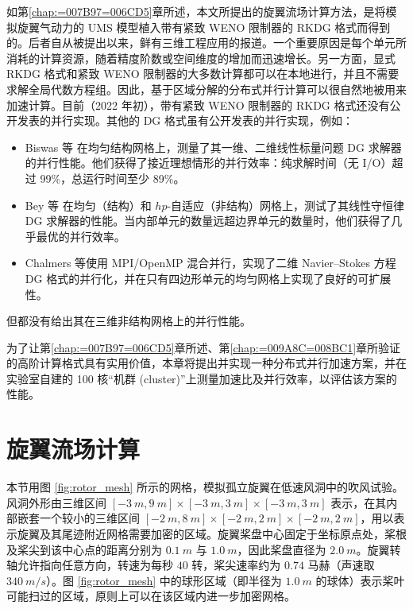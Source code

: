 如第\ref{chap:=007B97=006CD5}章所述，本文所提出的旋翼流场计算方法，是将模拟旋翼气动力的 UMS 模型植入带有紧致
WENO 限制器的 RKDG 格式而得到的。后者自从被提出以来，鲜有三维工程应用的报道。一个重要原因是每个单元所消耗的计算资源，随着精度阶数或空间维度的增加而迅速增长。另一方面，显式
RKDG 格式和紧致 WENO 限制器的大多数计算都可以在本地进行，并且不需要求解全局代数方程组。因此，基于区域分解的分布式并行计算可以很自然地被用来加速计算。目前（2022
年初），带有紧致 WENO 限制器的 RKDG 格式还没有公开发表的并行实现。其他的 DG 格式虽有公开发表的并行实现，例如：
\begin{itemize}
\item Biswas 等 在均匀结构网格上，测量了其一维、二维线性标量问题 DG 求解器的并行性能。他们获得了接近理想情形的并行效率：纯求解时间（无
I/O）超过 99\%，总运行时间至少 89\%。
\item Bey 等 在均匀（结构）和 $hp$-自适应（非结构）网格上，测试了其线性守恒律 DG 求解器的性能。当内部单元的数量远超边界单元的数量时，他们获得了几乎最优的并行效率。
\item Chalmers 等使用 MPI/OpenMP 混合并行，实现了二维 Navier–Stokes
方程 DG 格式的并行化，并在只有四边形单元的均匀网格上实现了良好的可扩展性。
\end{itemize}
但都没有给出其在三维非结构网格上的并行性能。

为了让第\ref{chap:=007B97=006CD5}章所述、第\ref{chap:=009A8C=008BC1}章所验证的高阶计算格式具有实用价值，本章将提出并实现一种分布式并行加速方案，并在实验室自建的
100 核“机群 (cluster)”上测量加速比及并行效率，以评估该方案的性能。

\section{旋翼流场计算\label{sec:rotor_in_tunnel}}

本节用图 \ref{fig:rotor_mesh} 所示的网格，模拟孤立旋翼在低速风洞中的吹风试验。风洞外形由三维区间 $[\SI{-3}{m},\SI{9}{m}]\times[\SI{-3}{m},\SI{3}{m}]\times[\SI{-3}{m},\SI{3}{m}]$
表示，在其内部嵌套一个较小的三维区间 $[\SI{-2}{m},\SI{8}{m}]\times[\SI{-2}{m},\SI{2}{m}]\times[\SI{-2}{m},\SI{2}{m}]$，用以表示旋翼及其尾迹附近网格需要加密的区域。旋翼桨盘中心固定于坐标原点处，桨根及桨尖到该中心点的距离分别为
$\SI{0.1}{m}$ 与 $\SI{1.0}{m}$，因此桨盘直径为 $\SI{2.0}{m}$。旋翼转轴允许指向任意方向，转速为每秒
$40$ 转，桨尖速率约为 $0.74$ 马赫（声速取 $\SI{340}{m/s}$）。图 \ref{fig:rotor_mesh}
中的球形区域（即半径为 $\SI{1.0}{m}$ 的球体）表示桨叶可能扫过的区域，原则上可以在该区域内进一步加密网格。

